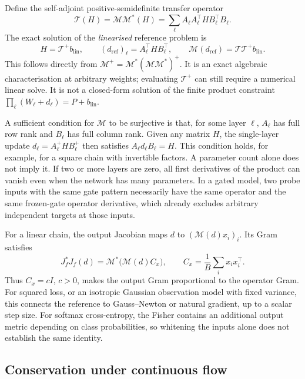\documentclass{article}
\theoremstyle{definition}
\theoremstyle{remark}
\begin{document}
Define the self-adjoint positive-semidefinite transfer operator
\begin{equation}
 \mathcal T(H)=\mathcal M\mathcal M^*(H)
 =\sum_\ell A_\ell A_\ell^\top H B_\ell^\top B_\ell.
 \label{eq:app-transfer}
\end{equation}
The exact solution of the \emph{linearised} reference problem is
\begin{equation}
 H=\mathcal T^+b_{\mathrm{lin}},\qquad
 (d_{\mathrm{ref}})_\ell=A_\ell^\top H B_\ell^\top,
 \qquad
 \mathcal M(d_{\mathrm{ref}})=\mathcal T\mathcal T^+b_{\mathrm{lin}}.
 \label{eq:app-linear-reference}
\end{equation}
This follows directly from $\mathcal M^+=\mathcal M^*(\mathcal M\mathcal M^*)^+$. It is an exact algebraic characterisation at arbitrary weights; evaluating $\mathcal T^+$ can still require a numerical linear solve. It is not a closed-form solution of the finite product constraint $\prod_\ell(W_\ell+d_\ell)=P+b_{\mathrm{lin}}$.

A sufficient condition for $\mathcal M$ to be surjective is that, for some layer $\ell$, $A_\ell$ has full row rank and $B_\ell$ has full column rank. Given any matrix $H$, the single-layer update $d_\ell=A_\ell^+ H B_\ell^+$ then satisfies $A_\ell d_\ell B_\ell=H$. This condition holds, for example, for a square chain with invertible factors. A parameter count alone does not imply it. If two or more layers are zero, all first derivatives of the product can vanish even when the network has many parameters. In a gated model, two probe inputs with the same gate pattern necessarily have the same operator and the same frozen-gate operator derivative, which already excludes arbitrary independent targets at those inputs.

For a linear chain, the output Jacobian maps $d$ to $(\mathcal M(d)x_i)_i$. Its Gram satisfies
\begin{equation}
 J_f^*J_f(d)=\mathcal M^*\big(\mathcal M(d)C_x\big),
 \qquad C_x=\frac1B\sum_i x_i x_i^\top.
\end{equation}
Thus $C_x=cI$, $c>0$, makes the output Gram proportional to the operator Gram. For squared loss, or an isotropic Gaussian observation model with fixed variance, this connects the reference to Gauss--Newton or natural gradient, up to a scalar step size. For softmax cross-entropy, the Fisher contains an additional output metric depending on class probabilities, so whitening the inputs alone does not establish the same identity.

\subsection{Conservation under continuous flow}
\end{document}

